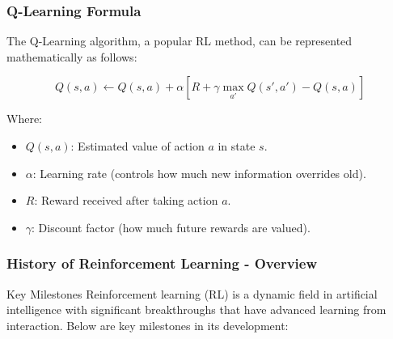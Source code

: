 \documentclass{beamer}
\begin{document}
\begin{frame}[fragile]
    \frametitle{Q-Learning Formula}
    The Q-Learning algorithm, a popular RL method, can be represented mathematically as follows:

    \begin{equation}
        Q(s, a) \gets Q(s, a) + \alpha[R + \gamma \max_{a'} Q(s', a') - Q(s, a)]
    \end{equation}

    Where:
    \begin{itemize}
        \item \( Q(s, a) \): Estimated value of action \( a \) in state \( s \).
        \item \( \alpha \): Learning rate (controls how much new information overrides old).
        \item \( R \): Reward received after taking action \( a \).
        \item \( \gamma \): Discount factor (how much future rewards are valued).
    \end{itemize}
\end{frame}

\begin{frame}[fragile]
    \frametitle{History of Reinforcement Learning - Overview}
    \begin{block}{Key Milestones}
        Reinforcement learning (RL) is a dynamic field in artificial intelligence with significant breakthroughs that have advanced learning from interaction. Below are key milestones in its development:
    \end{block}
\end{frame}
\end{document}
